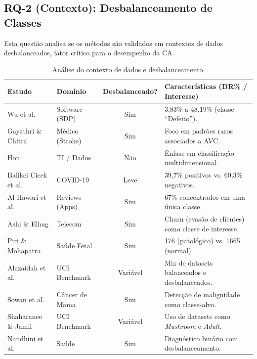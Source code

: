 \subsection{RQ-2 (Contexto): Desbalanceamento de Classes}

Esta questão analisa se os métodos são validados em contextos de dados desbalanceados, fator crítico para o desempenho da CA.

\begin{table}[H]
\centering
\footnotesize
\setlength{\tabcolsep}{4pt}
\renewcommand{\arraystretch}{1.2}
\caption{Análise do contexto de dados e desbalanceamento.}
\label{tab:rq2}
\begin{tabularx}{\textwidth}{|p{3.2cm}|p{3.0cm}|c|X|}
\hline
\textbf{Estudo} & \textbf{Domínio} & \textbf{Desbalanceado?} & \textbf{Características (DR\% / Interesse)} \\
\hline
Wu et al. \cite{wu2024novel} & Software (SDP) & Sim & 3,83\% a 48,19\% (classe ``Defeito''). \\
\hline
Gayathri \& Chitra \cite{gayathri2015efficient} & Médico (Stroke) & Sim & Foco em padrões raros associados a AVC. \\
\hline
Hou \cite{hou2025improved} & TI / Dados & Não & Ênfase em classificação multidimensional. \\
\hline
Balikci Cicek et al. \cite{cicek2021assessment} & COVID-19 & Leve & 39,7\% positivos vs. 60,3\% negativos. \\
\hline
Al-Hawari et al. \cite{alhawari2021classification} & Reviews (Apps) & Sim & 67\% concentrados em uma única classe. \\
\hline
Ashi \& Elhag \cite{ashi2021enhancing} & Telecom & Sim & Churn (evasão de clientes) como classe de interesse. \\
\hline
Piri \& Mohapatra \cite{piri2019exploring} & Saúde Fetal & Sim & 176 (patológico) vs. 1665 (normal). \\
\hline
Alazaidah et al. \cite{alazaidah2021feature} & UCI Benchmark & Variável & Mix de datasets balanceados e desbalanceados. \\
\hline
Sowan et al. \cite{sowan2023hybrid} & Câncer de Mama & Sim & Detecção de malignidade como classe-alvo. \\
\hline
Shaharanee \& Jamil \cite{shaharanee2015irrelevant} & UCI Benchmark & Variável & Uso de datasets como \textit{Mushroom} e \textit{Adult}. \\
\hline
Nandhini et al. \cite{nandhini2020performance} & Saúde & Sim & Diagnóstico binário com desbalanceamento. \\
\hline
\end{tabularx}
\end{table}

